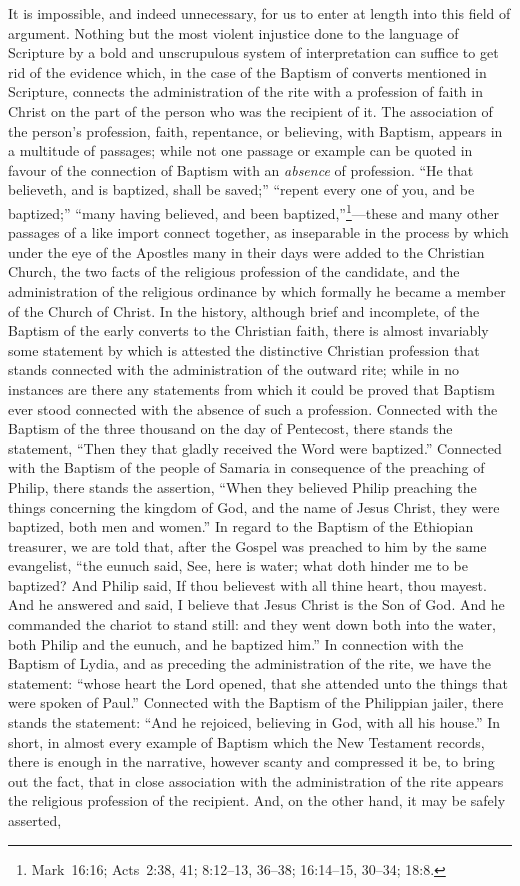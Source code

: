 \documentclass[
]{book}
\begin{document}
It is impossible, and indeed unnecessary, for us to enter at length into this field of argument. Nothing but the most violent injustice done to the language of Scripture by a bold and unscrupulous system of interpretation can suffice to get rid of the evidence which, in the case of the Baptism of converts mentioned in Scripture, connects the administration of the rite with a profession of faith in Christ on the part of the person who was the recipient of it. The association of the person's profession, faith, repentance, or believing, with Baptism, appears in a multitude of passages; while not one passage or example can be quoted in favour of the connection of Baptism with an \emph{absence} of profession. ``He that believeth, and is baptized, shall be saved;'' ``repent every one of you, and be baptized;'' ``many having believed, and been baptized,''\footnote{Mark~16:16; Acts~2:38, 41; 8:12--13, 36--38; 16:14--15, 30--34; 18:8.}---these and many other passages of a like import connect together, as inseparable in the process by which under the eye of the Apostles many in their days were added to the Christian Church, the two facts of the religious profession of the candidate, and the administration of the religious ordinance by which formally he became a member of the Church of Christ. In the history, although brief and incomplete, of the Baptism of the early converts to the Christian faith, there is almost invariably some statement by which is attested the distinctive Christian profession that stands connected with the administration of the outward rite; while in no instances are there any statements from which it could be proved that Baptism ever stood connected with the absence of such a profession. Connected with the Baptism of the three thousand on the day of Pentecost, there stands the statement, ``Then they that gladly received the Word were baptized.'' Connected with the Baptism of the people of Samaria in consequence of the preaching of Philip, there stands the assertion, ``When they believed Philip preaching the things concerning the kingdom of God, and the name of Jesus Christ, they were baptized, both men and women.'' In regard to the Baptism of the Ethiopian treasurer, we are told that, after the Gospel was preached to him by the same evangelist, ``the eunuch said, See, here is water; what doth hinder me to be baptized? And Philip said, If thou believest with all thine heart, thou mayest. And he answered and said, I believe that Jesus Christ is the Son of God. And he commanded the chariot to stand still: and they went down both into the water, both Philip and the eunuch, and he baptized him.'' In connection with the Baptism of Lydia, and as preceding the administration of the rite, we have the statement: ``whose heart the Lord opened, that she attended unto the things that were spoken of Paul.'' Connected with the Baptism of the Philippian jailer, there stands the statement: ``And he rejoiced, believing in God, with all his house.'' In short, in almost every example of Baptism which the New Testament records, there is enough in the narrative, however scanty and compressed it be, to bring out the fact, that in close association with the administration of the rite appears the religious profession of the recipient. And, on the other hand, it may be safely asserted, 
\end{document}

